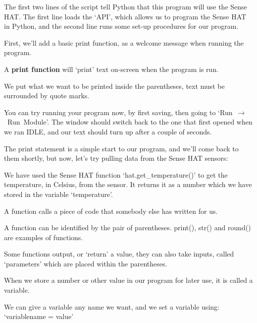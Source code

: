 	
	
	The first two lines of the script tell Python that this program will use the Sense HAT.
	The first line loads the `API', which allows us to program the Sense HAT in Python, and
	the second line runs some set-up procedures for our program.
	
	First, we'll add a basic print function, as a welcome message when running the program.
	
	\ifprint\else
	\begin{aside}[print()]
		A \textbf{print function} will `print' text on-screen when the program is run.
		
		We put what we want to be printed inside the parentheses, text must be surrounded by quote marks.
	\end{aside}
	\fi
	
	
	
	You can try running your program now, by first saving, then going to \mbox{`Run $\rightarrow$ Run Module'}. The window should switch back to the one that first opened when we ran IDLE, and our text should turn up after a couple of seconds.
	
	The print statement is a simple start to our program, and we'll come back to them shortly, but now, let's try pulling data from the Sense HAT sensors:
	
	
	
	We have used the Sense HAT function `hat.get\_temperature()' to get the temperature, in Celsius, from the sensor. It returns it as a number which we have stored in the variable `temperature'.
	
	\ifprint\else
	\begin{aside}[Function]
		A function calls a piece of code that somebody else has written for us.
		
		A function can be identified by the pair of parentheses. print(), str() and round() are examples of functions.
		
		Some functions output, or `return' a value, they can also take inputs, called `parameters' which are placed within the parentheses.
	\end{aside}
	\begin{aside}[Variable]
		When we store a number or other value in our program for later use, it is called a variable.
		
		We can give a variable any name we want, and we set a variable using: `variablename = value'
	\end{aside}
	\fi
	
